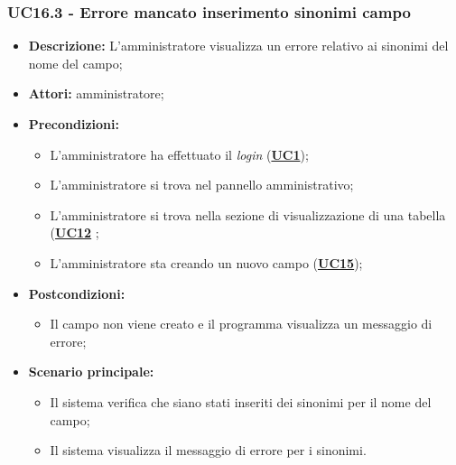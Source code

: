 \subsubsection{UC16.3 - Errore mancato inserimento sinonimi campo}
\label{sec:UC16.3}
\begin{itemize}
	\item \textbf{Descrizione:} L’amministratore visualizza un errore relativo ai sinonimi del nome del campo;
	\item \textbf{Attori:} amministratore;
	\item \textbf{Precondizioni:} 
	\begin{itemize}
		\item L’amministratore ha effettuato il \textit{login} (\hyperref[sec:UC1]{\textbf{UC1}});
		\item L’amministratore si trova nel pannello amministrativo;
		\item L’amministratore si trova nella sezione di visualizzazione di una tabella (\hyperref[sec:UC12]{\textbf{UC12}} ;
		\item L’amministratore sta creando un nuovo campo (\hyperref[sec:UC15]{\textbf{UC15}});
	\end{itemize}
	\item \textbf{Postcondizioni:} 
	\begin{itemize}
		\item Il campo non viene creato e il programma visualizza un messaggio di errore;
	\end{itemize}
	\item \textbf{Scenario principale:} 
	\begin{itemize}
		\item Il sistema verifica che siano stati inseriti dei sinonimi per il nome del campo;
		\item Il sistema visualizza il messaggio di errore per i sinonimi.
	\end{itemize}
\end{itemize}

